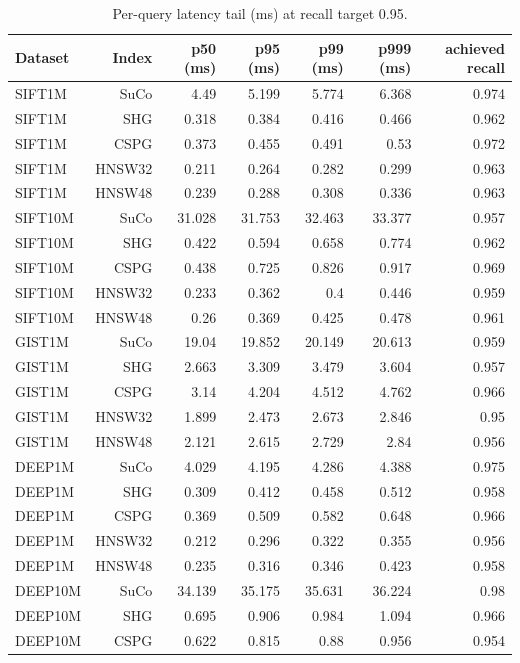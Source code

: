 \begin{table}[t]
\centering
\small
\caption{Per-query latency tail (ms) at recall target 0.95.}
\label{tab:latency-tail-r95}
\begin{tabular}{lrrrrrr}
\toprule
Dataset & Index & p50 (ms) & p95 (ms) & p99 (ms) & p999 (ms) & achieved recall \\
\midrule
SIFT1M & SuCo & 4.49 & 5.199 & 5.774 & 6.368 & 0.974 \\
SIFT1M & SHG & 0.318 & 0.384 & 0.416 & 0.466 & 0.962 \\
SIFT1M & CSPG & 0.373 & 0.455 & 0.491 & 0.53 & 0.972 \\
SIFT1M & HNSW32 & 0.211 & 0.264 & 0.282 & 0.299 & 0.963 \\
SIFT1M & HNSW48 & 0.239 & 0.288 & 0.308 & 0.336 & 0.963 \\
SIFT10M & SuCo & 31.028 & 31.753 & 32.463 & 33.377 & 0.957 \\
SIFT10M & SHG & 0.422 & 0.594 & 0.658 & 0.774 & 0.962 \\
SIFT10M & CSPG & 0.438 & 0.725 & 0.826 & 0.917 & 0.969 \\
SIFT10M & HNSW32 & 0.233 & 0.362 & 0.4 & 0.446 & 0.959 \\
SIFT10M & HNSW48 & 0.26 & 0.369 & 0.425 & 0.478 & 0.961 \\
GIST1M & SuCo & 19.04 & 19.852 & 20.149 & 20.613 & 0.959 \\
GIST1M & SHG & 2.663 & 3.309 & 3.479 & 3.604 & 0.957 \\
GIST1M & CSPG & 3.14 & 4.204 & 4.512 & 4.762 & 0.966 \\
GIST1M & HNSW32 & 1.899 & 2.473 & 2.673 & 2.846 & 0.95 \\
GIST1M & HNSW48 & 2.121 & 2.615 & 2.729 & 2.84 & 0.956 \\
DEEP1M & SuCo & 4.029 & 4.195 & 4.286 & 4.388 & 0.975 \\
DEEP1M & SHG & 0.309 & 0.412 & 0.458 & 0.512 & 0.958 \\
DEEP1M & CSPG & 0.369 & 0.509 & 0.582 & 0.648 & 0.966 \\
DEEP1M & HNSW32 & 0.212 & 0.296 & 0.322 & 0.355 & 0.956 \\
DEEP1M & HNSW48 & 0.235 & 0.316 & 0.346 & 0.423 & 0.958 \\
DEEP10M & SuCo & 34.139 & 35.175 & 35.631 & 36.224 & 0.98 \\
DEEP10M & SHG & 0.695 & 0.906 & 0.984 & 1.094 & 0.966 \\
DEEP10M & CSPG & 0.622 & 0.815 & 0.88 & 0.956 & 0.954 \\

\end{tabular}
\end{table}
